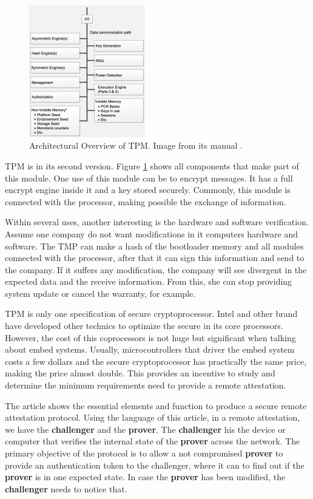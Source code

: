 \begin{figure}[h]
	\centering
	\includegraphics[width=0.45\textwidth]{figuras/tpm}
	\caption{Architectural Overview of TPM. Image from its manual \cite{tpm}.}
	\label{fig:tpm}
\end{figure}

TPM is in its second version. Figure \ref{fig:tpm} shows all components that make part of this module. One use of this module can be to encrypt messages. It has a full encrypt engine inside it and a key stored securely. Commonly, this module is connected with the processor, making possible the exchange of information. 

Within several uses, another interesting is the hardware and software verification. Assume one company do not want modifications in it computers hardware and software. The TMP can make a hash of the bootloader memory and all modules connected with the processor, after that it can sign this information and send to the company. If it suffers any modification, the company will see divergent in the expected data and the receive information. From this, she can stop providing system update or cancel the warranty, for example.

TPM is only one specification of secure cryptoprocessor. Intel and other brand have developed other technics to optimize the secure in its core processors.  However, the cost of this coprocessors is not huge but significant when talking about embed systems.  Usually, microcontrollers that driver the embed system costs a few dollars and the secure cryptoprocessor has practically the same price, making the price almost double. This provides an incentive to study and determine the minimum requirements need to provide a remote attestation. 

The article \cite{minimalistaproacRA} shows the essential elements and function to produce a secure remote attestation protocol. Using the language of this article, in a remote attestation, we have the \textbf{challenger} and the \textbf{prover}. The \textbf{challenger} his the device or computer that verifies the internal state of the \textbf{prover} across the network. The primary objective of the protocol is to allow a not compromised \textbf{prover} to provide an authentication token to the challenger, where it can to find out if the \textbf{prover} is in one expected state.  In case the \textbf{prover} has been modified, the \textbf{challenger} needs to notice that.

